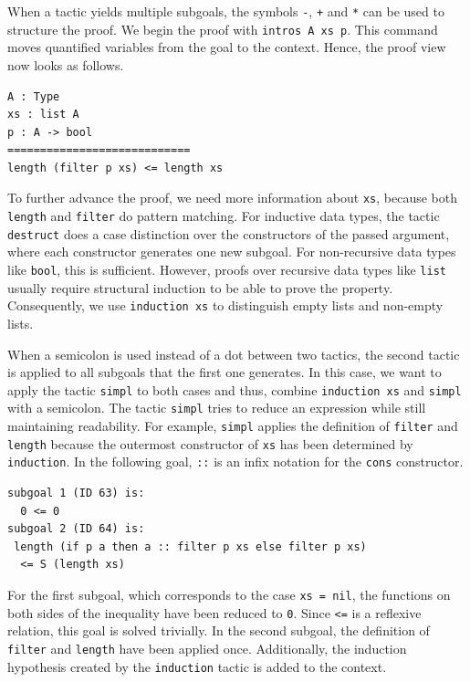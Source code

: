 \documentclass[a4paper, 11pt, fleqn, twoside]{scrreprt}
\newcommand{\cinl}[1]{\texttt{#1}}
\begin{document}
When a tactic yields multiple subgoals, the symbols \cinl{-}, \cinl{+} and \cinl{*} can be used to structure the proof.
We begin the proof with \cinl{intros A xs p}. 
This command moves quantified variables from the goal to the context.
Hence, the proof view now looks as follows.

\begin{verbatim}
A : Type
xs : list A
p : A -> bool
============================
length (filter p xs) <= length xs
\end{verbatim}

To further advance the proof, we need more information about \cinl{xs}, because both \cinl{length} and \cinl{filter} do pattern matching.
For inductive data types, the tactic \cinl{destruct} does a case distinction over the constructors of the passed argument, where each constructor generates one new subgoal.
For non-recursive data types like \cinl{bool}, this is sufficient.
However, proofs over recursive data types like \cinl{list} usually require structural induction to be able to prove the property.
Consequently, we use \cinl{induction xs} to distinguish empty lists and non-empty lists.

When a semicolon is used instead of a dot between two tactics, the second tactic is applied to all subgoals that the first one generates.
In this case, we want to apply the tactic \cinl{simpl} to both cases and thus, combine \cinl{induction xs} and \cinl{simpl} with a semicolon.
The tactic \cinl{simpl} tries to reduce an expression while still maintaining readability.
For example, \cinl{simpl} applies the definition of \cinl{filter} and \cinl{length} because the outermost constructor of \cinl{xs} has been determined by \cinl{induction}.
In the following goal, \cinl{::} is an infix notation for the \cinl{cons} constructor.

\begin{verbatim}
subgoal 1 (ID 63) is:
  0 <= 0
subgoal 2 (ID 64) is:
 length (if p a then a :: filter p xs else filter p xs) 
  <= S (length xs)
\end{verbatim}

For the first subgoal, which corresponds to the case \cinl{xs = nil}, the functions on both sides of the inequality have been reduced to \cinl{0}.
Since \cinl{<=} is a reflexive relation, this goal is solved trivially.
In the second subgoal, the definition of \cinl{filter} and \cinl{length} have been applied once.
Additionally, the induction hypothesis created by the \cinl{induction} tactic is added to the context.
\end{document}
